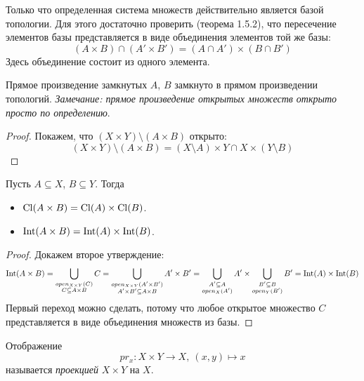 \begin{lemma}
	Только что определенная система множеств действительно является базой топологии.
	Для этого достаточно проверить (теорема 1.5.2), что пересечение элементов базы
	представляется в виде объединения элементов той же базы:
\[
	(A \times B) \cap (A' \times B') = (A \cap A') \times (B \cap B')	
\]
	Здесь объединение состоит из одного элемента.
\end{lemma}

\begin{theorem}
	Прямое произведение замкнутых $A$, $B$ замкнуто в прямом произведении топологий.
	\textit{Замечание: прямое произведение открытых множеств открыто просто по определению}.
\end{theorem}
\begin{proof}
	Покажем, что $(X \times Y) \setminus (A \times B)$ открыто:
\[
	(X \times Y) \setminus (A \times B) = (X \setminus A) \times Y \cap X \times (Y \setminus B)
\]
\end{proof}

\begin{remark}
	Пусть $A \subseteq X$, $B \subseteq Y$. Тогда
	\begin{itemize}
		\item $\operatorname{Cl}(A \times B) = \operatorname{Cl}(A) \times \operatorname{Cl}(B)$.
		\item $\operatorname{Int}(A \times B) = \operatorname{Int}(A) \times \operatorname{Int}(B)$.
	\end{itemize}
\end{remark}
\begin{proof}
	Докажем второе утверждение:
\[
	\operatorname{Int}(A \times B) = \bigcup_{\substack{open_{X\times Y}(C) \\ C \subseteq A \times B}}{C}
	= \bigcup_{\substack{open_{X \times Y}(A' \times B') \\ A'\times B' \subseteq A \times B}}
	{A' \times B'} = \bigcup_{\substack{A' \subseteq A \\ open_X(A')}}{A'} 
	\times \bigcup_{\substack{B' \subseteq B \\ open_Y(B')}}{B'} = \operatorname{Int}(A) \times \operatorname{Int}(B)
\]
	Первый переход можно сделать, потому что любое открытое множество $C$ представляется
	в виде объединения множеств из базы.
\end{proof}

\begin{definition}
	Отображение
\[
	pr_x \colon X \times Y \to X,~ (x, y) \mapsto x
\]
	называется \textit{проекцией} $X \times Y$ на $X$.
\end{definition}

